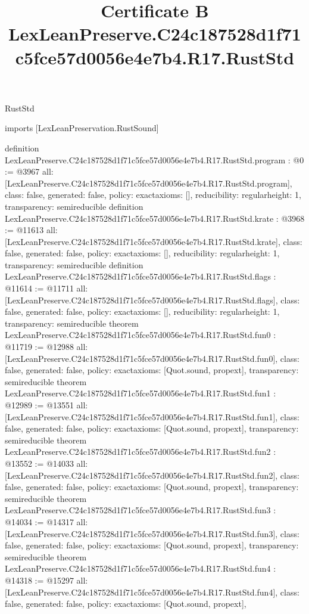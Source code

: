 \begin{lexlean}{RustStd}
\title{Certificate B LexLeanPreserve.C24c187528d1f71c5fce57d0056e4e7b4.R17.RustStd}
\begin{coremodule}
imports [LexLeanPreservation.RustSound]

definition LexLeanPreserve.C24c187528d1f71c5fce57d0056e4e7b4.R17.RustStd.program : @0 := @3967 {
  all: [LexLeanPreserve.C24c187528d1f71c5fce57d0056e4e7b4.R17.RustStd.program],
  class: false,
  generated: false,
  policy: exact{axioms: []},
  reducibility: regular{height: 1},
  transparency: semireducible
}
definition LexLeanPreserve.C24c187528d1f71c5fce57d0056e4e7b4.R17.RustStd.krate : @3968 := @11613 {
  all: [LexLeanPreserve.C24c187528d1f71c5fce57d0056e4e7b4.R17.RustStd.krate],
  class: false,
  generated: false,
  policy: exact{axioms: []},
  reducibility: regular{height: 1},
  transparency: semireducible
}
definition LexLeanPreserve.C24c187528d1f71c5fce57d0056e4e7b4.R17.RustStd.flags : @11614 := @11711 {
  all: [LexLeanPreserve.C24c187528d1f71c5fce57d0056e4e7b4.R17.RustStd.flags],
  class: false,
  generated: false,
  policy: exact{axioms: []},
  reducibility: regular{height: 1},
  transparency: semireducible
}
theorem LexLeanPreserve.C24c187528d1f71c5fce57d0056e4e7b4.R17.RustStd.fun0 : @11719 := @12988 {
  all: [LexLeanPreserve.C24c187528d1f71c5fce57d0056e4e7b4.R17.RustStd.fun0],
  class: false,
  generated: false,
  policy: exact{axioms: [Quot.sound, propext]},
  transparency: semireducible
}
theorem LexLeanPreserve.C24c187528d1f71c5fce57d0056e4e7b4.R17.RustStd.fun1 : @12989 := @13551 {
  all: [LexLeanPreserve.C24c187528d1f71c5fce57d0056e4e7b4.R17.RustStd.fun1],
  class: false,
  generated: false,
  policy: exact{axioms: [Quot.sound, propext]},
  transparency: semireducible
}
theorem LexLeanPreserve.C24c187528d1f71c5fce57d0056e4e7b4.R17.RustStd.fun2 : @13552 := @14033 {
  all: [LexLeanPreserve.C24c187528d1f71c5fce57d0056e4e7b4.R17.RustStd.fun2],
  class: false,
  generated: false,
  policy: exact{axioms: [Quot.sound, propext]},
  transparency: semireducible
}
theorem LexLeanPreserve.C24c187528d1f71c5fce57d0056e4e7b4.R17.RustStd.fun3 : @14034 := @14317 {
  all: [LexLeanPreserve.C24c187528d1f71c5fce57d0056e4e7b4.R17.RustStd.fun3],
  class: false,
  generated: false,
  policy: exact{axioms: [Quot.sound, propext]},
  transparency: semireducible
}
theorem LexLeanPreserve.C24c187528d1f71c5fce57d0056e4e7b4.R17.RustStd.fun4 : @14318 := @15297 {
  all: [LexLeanPreserve.C24c187528d1f71c5fce57d0056e4e7b4.R17.RustStd.fun4],
  class: false,
  generated: false,
  policy: exact{axioms: [Quot.sound, propext]},
}
\end{coremodule}
\end{lexlean}
